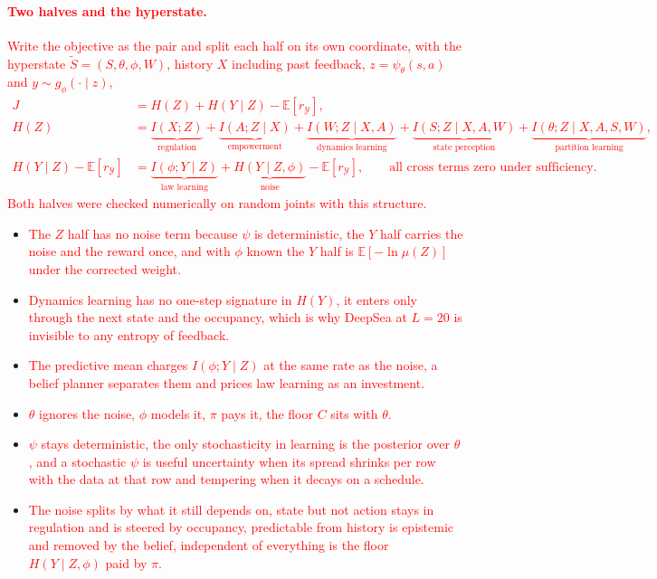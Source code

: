 \documentclass[10pt]{article}
\newcommand{\add}[1]{\textcolor{red}{#1}}
\begin{document}
\paragraph{\add{Two halves and the hyperstate.}}
\add{Write the objective as the pair and split each half on its own coordinate, with the hyperstate $\tilde S = (S, \theta, \phi, W)$, history $X$ including past feedback, $z = \psi_\theta(s,a)$ and $y \sim g_\phi(\cdot \mid z)$,
\begin{align*}
  J &= H(Z) + H(Y \mid Z) - \mathbb E[r_{\mathcal Y}], \\
  H(Z) &= \underbrace{I(X;Z)}_{\text{regulation}} + \underbrace{I(A;Z \mid X)}_{\text{empowerment}} + \underbrace{I(W;Z \mid X,A)}_{\text{dynamics learning}} + \underbrace{I(S;Z \mid X,A,W)}_{\text{state perception}} + \underbrace{I(\theta;Z \mid X,A,S,W)}_{\text{partition learning}}, \\
  H(Y \mid Z) - \mathbb E[r_{\mathcal Y}] &= \underbrace{I(\phi;Y \mid Z)}_{\text{law learning}} + \underbrace{H(Y \mid Z,\phi)}_{\text{noise}} - \mathbb E[r_{\mathcal Y}], \qquad \text{all cross terms zero under sufficiency.}
\end{align*}
Both halves were checked numerically on random joints with this structure.}
\begin{itemize}
  \item \add{The $Z$ half has no noise term because $\psi$ is deterministic, the $Y$ half carries the noise and the reward once, and with $\phi$ known the $Y$ half is $\mathbb E[-\ln \mu(Z)]$ under the corrected weight.}
  \item \add{Dynamics learning has no one-step signature in $H(Y)$, it enters only through the next state and the occupancy, which is why DeepSea at $L = 20$ is invisible to any entropy of feedback.}
  \item \add{The predictive mean charges $I(\phi;Y \mid Z)$ at the same rate as the noise, a belief planner separates them and prices law learning as an investment.}
  \item \add{$\theta$ ignores the noise, $\phi$ models it, $\pi$ pays it, the floor $C$ sits with $\theta$.}
  \item \add{$\psi$ stays deterministic, the only stochasticity in learning is the posterior over $\theta$, and a stochastic $\psi$ is useful uncertainty when its spread shrinks per row with the data at that row and tempering when it decays on a schedule.}
  \item \add{The noise splits by what it still depends on, state but not action stays in regulation and is steered by occupancy, predictable from history is epistemic and removed by the belief, independent of everything is the floor $H(Y \mid Z,\phi)$ paid by $\pi$.}
\end{itemize}
\end{document}
